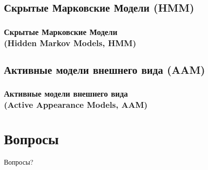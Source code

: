 \documentclass{beamer}
\begin{document}
\subsection{Скрытые Марковские Модели (HMM)}

\begin{frame}
\frametitle{Скрытые Марковские Модели\\(Hidden Markov Models, HMM)}

\end{frame}

\subsection{Активные модели внешнего вида (AAM)}

\begin{frame}
\frametitle{Активные модели внешнего вида\\(Active Appearance Models, AAM)}

\end{frame}

\section{Вопросы}

\begin{frame}
\Huge{\centerline{Вопросы?}}
\end{frame}

\end{document}
